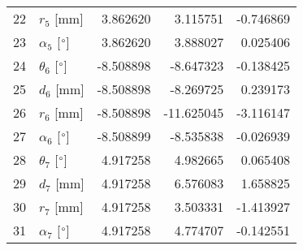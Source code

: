 \documentclass{standalone}%
\begin{document}
\begin{tabular}{llrrr}
22 &              $r_{5}$ [mm] &  3.862620 &   3.115751 &  -0.746869 \\
23 &  $\alpha_{5}$ [$\degree$] &  3.862620 &   3.888027 &   0.025406 \\
24 &  $\theta_{6}$ [$\degree$] & -8.508898 &  -8.647323 &  -0.138425 \\
25 &              $d_{6}$ [mm] & -8.508898 &  -8.269725 &   0.239173 \\
26 &              $r_{6}$ [mm] & -8.508898 & -11.625045 &  -3.116147 \\
27 &  $\alpha_{6}$ [$\degree$] & -8.508899 &  -8.535838 &  -0.026939 \\
28 &  $\theta_{7}$ [$\degree$] &  4.917258 &   4.982665 &   0.065408 \\
29 &              $d_{7}$ [mm] &  4.917258 &   6.576083 &   1.658825 \\
30 &              $r_{7}$ [mm] &  4.917258 &   3.503331 &  -1.413927 \\
31 &  $\alpha_{7}$ [$\degree$] &  4.917258 &   4.774707 &  -0.142551 \\
\bottomrule
\end{tabular}
%
\end{document}
